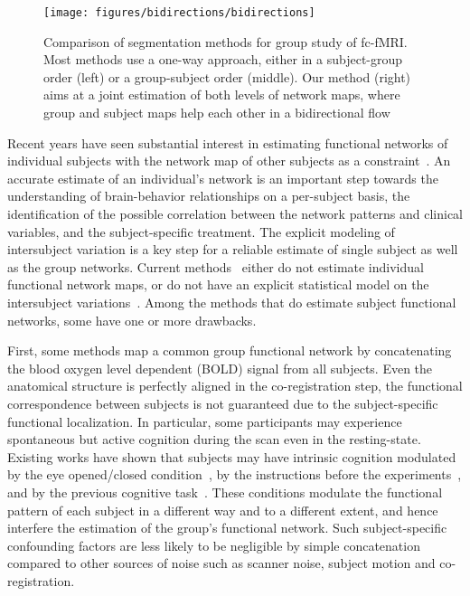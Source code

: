 \documentclass[review,authoryear]{elsarticle}
\begin{document}
\begin{figure*}[htb]
  \centering
  \texttt{[image: figures/bidirections/bidirections]}
  \caption{Comparison of segmentation methods for group study of fc-fMRI. Most
    methods use a one-way approach, either in a subject-group order (left) or a
    group-subject order (middle). Our method (right) aims at a joint estimation
    of both levels of network maps, where group and subject maps help each other
    in a bidirectional flow}
  \label{fig:bidirections}
\end{figure*}

Recent years have seen substantial interest in estimating functional networks of
individual subjects with the network map of other subjects as a
constraint~\citep{ng2012modeling, varoquaux2011multi, beckmann2009group}. An
accurate estimate of an individual's network is an important step towards the
understanding of brain-behavior relationships on a per-subject basis, the
identification of the possible correlation between the network patterns and
clinical variables, and the subject-specific treatment. The explicit modeling of
intersubject variation is a key step for a reliable estimate of single subject
as well as the group networks.  Current methods~\citep{yeo2011organization,
  damoiseaux2006consistent} either do not estimate individual functional network
maps, or do not have an explicit statistical model on the intersubject
variations~\citep{calhoun2001method, calhoun2001spatial}.  Among the methods
that do estimate subject functional networks, some have one or more drawbacks.

First, some methods map a common group functional network by concatenating the
blood oxygen level dependent (BOLD) signal from all subjects. Even the
anatomical structure is perfectly aligned in the co-registration step, the
functional correspondence between subjects is not guaranteed due to the
subject-specific functional localization. In particular, some participants may
experience spontaneous but active cognition during the scan even in the
resting-state. Existing works have shown that subjects may have intrinsic
cognition modulated by the eye opened/closed condition~\citep{van2010intrinsic},
by the instructions before the experiments~\citep{benjamin2010influence}, and by
the previous cognitive task~\citep{waites2005effect}. These conditions modulate
the functional pattern of each subject in a different way and to a different
extent, and hence interfere the estimation of the group's functional
network. Such subject-specific confounding factors are less likely to be
negligible by simple concatenation compared to other sources of noise such as
scanner noise, subject motion and co-registration.
\end{document}
